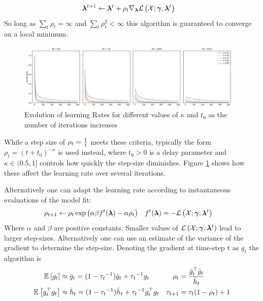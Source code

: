 \begin{align}
{  \bm \lambda  }^{t+1} & \leftarrow {  \bm \lambda  }^t + \rho_t \nabla_{ \bm \lambda }{ \mathcal{L}\left({ \mathcal{X} }; \bm \gamma, { \bm \lambda }^{{t}} \right) }
\end{align}
So long as $\sum_t \rho_t = \infty$ and $\sum_t \rho^2_t < \infty$ this algorithm is guaranteed to converge on a local minimum\cite{RobbinsMonro1951}.

\begin{figure}
  \centering
    \includegraphics[width=0.97\textwidth]{./Chap1/plots/learning_rate.pdf}
  \caption{Evolution of learning Rates for different values of $\kappa$ and $t_0$ as the number of iterations increases}
  \label{fig:learning-rates}
\end{figure}

While a step size of $\rho_t = \frac{1}{ {t} }$ meets these criteria, typically\cite{Gopalan2013}\cite{Hoffman2012}\cite{Hoffman2010} the form $\rho_t = (t + t_0)^{-\kappa}$ is used instead, where $t_0 > 0$ is a delay parameter and $\kappa \in (0.5,1]$ controls how quickly the step-size diminishes. Figure \ref{fig:learning-rates} shows how these affect the learning rate over several iterations.

Alternatively one can adapt the learning rate according to instantaneous evaluations of the model fit\cite{Amari1998}:
\begin{align}
\rho_{t+1} & \leftarrow  \rho_t \exp\left( \alpha\beta f^t({ \bm \lambda })  - \alpha\rho_t \right) & f^t({ \bm \lambda }) &= -{ \mathcal{L}\left({ \mathcal{X} }; \bm \gamma, { \bm \lambda }^{{t}} \right) }
\end{align}
Where  $\alpha$ and $\beta$ are positive constants. Smaller values of ${ \mathcal{L}\left({ \mathcal{X} }; \bm \gamma, { \bm \lambda }^{{t}} \right) }$ lead to larger step-sizes. Alternatively one can use an estimate of the variance of the gradient\cite{Ho2012} to determine the step-size. Denoting the gradient at time-step t as $g_t$ the algorithm is
\begin{align}
\mathbb{E}_{ {  } }\left[ g_t \right] & \approx \bar{g}_t = (1 - {\tau_t}^{-1})\bar{g}_t + {\tau_t}^{-1}g_t 
& \rho_t & = \frac{\bar{g}_t ^\top \bar{g}_t}{\bar{h}_t} \\
\mathbb{E}_{ {  } }\left[ g_t ^\top g_t \right] & \approx \bar{h}_t = (1 - {\tau_t}^{-1})\bar{h}_t + {\tau_t}^{-1}g_t^\top g_t &
\tau_{t+1} & = \tau_t(1 - \rho_t) + 1
\end{align}


